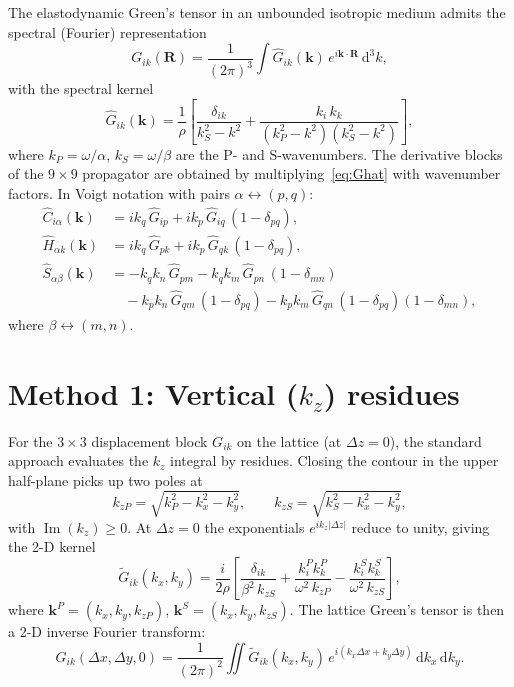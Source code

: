 \documentclass[11pt,a4paper]{article}
\newcommand{\dd}{\mathrm{d}}
\newcommand{\im}{\operatorname{Im}}
\newcommand{\bk}{\mathbf{k}}
\newcommand{\bR}{\mathbf{R}}
\begin{document}
The elastodynamic Green's tensor in an unbounded isotropic
medium admits the spectral (Fourier) representation
\begin{equation}\label{eq:Gspec}
  G_{ik}(\bR) = \frac{1}{(2\pi)^3}
  \int \hat{G}_{ik}(\bk)\,e^{i\bk\cdot\bR}\,\dd^3 k,
\end{equation}
with the spectral kernel
\begin{equation}\label{eq:Ghat}
  \hat{G}_{ik}(\bk) = \frac{1}{\rho}\left[
    \frac{\delta_{ik}}{k_S^2 - k^2}
    + \frac{k_i\,k_k}{\left(k_P^2 - k^2\right)\left(k_S^2 - k^2\right)}
  \right],
\end{equation}
where $k_P = \omega/\alpha$, $k_S = \omega/\beta$ are the P- and
S-wavenumbers.
The derivative blocks of the $9\times 9$ propagator are obtained by
multiplying~\eqref{eq:Ghat} with wavenumber factors.
In Voigt notation with pairs
$\alpha \leftrightarrow (p,q)$:
\begin{equation}\label{eq:blocks_spectral}
\begin{aligned}
  \hat{C}_{i\alpha}(\bk)
    &= i k_q\,\hat{G}_{ip}
       + i k_p\,\hat{G}_{iq}\,(1-\delta_{pq}),\\[4pt]
  \hat{H}_{\alpha k}(\bk)
    &= i k_q\,\hat{G}_{pk}
       + i k_p\,\hat{G}_{qk}\,(1-\delta_{pq}),\\[4pt]
  \hat{S}_{\alpha\beta}(\bk)
    &= -k_q k_n\,\hat{G}_{pm}
       -k_q k_m\,\hat{G}_{pn}\,(1-\delta_{mn})\\
    &\quad -k_p k_n\,\hat{G}_{qm}\,(1-\delta_{pq})
       -k_p k_m\,\hat{G}_{qn}\,(1-\delta_{pq})(1-\delta_{mn}),
\end{aligned}
\end{equation}
where $\beta \leftrightarrow (m,n)$.


\section{Method 1: Vertical (\texorpdfstring{$k_z$}{kz}) residues}\label{sec:kz}

For the $3\times 3$ displacement block $G_{ik}$ on the lattice
(at $\Delta z = 0$), the standard approach evaluates the $k_z$
integral by residues. Closing the contour in the upper half-plane
picks up two poles at
\[
  k_{zP} = \sqrt{k_P^2 - k_x^2 - k_y^2}, \qquad
  k_{zS} = \sqrt{k_S^2 - k_x^2 - k_y^2},
\]
with $\im(k_z) \ge 0$. At $\Delta z=0$ the exponentials
$e^{ik_{z}|{\Delta z}|}$ reduce to unity, giving the 2-D kernel
\begin{equation}\label{eq:kz_kernel}
  \tilde{G}_{ik}(k_x,k_y) = \frac{i}{2\rho}\left[
    \frac{\delta_{ik}}{\beta^2\,k_{zS}}
    + \frac{k^P_i k^P_k}{\omega^2\,k_{zP}}
    - \frac{k^S_i k^S_k}{\omega^2\,k_{zS}}
  \right],
\end{equation}
where $\bk^P = (k_x, k_y, k_{zP})$, $\bk^S = (k_x, k_y, k_{zS})$.
The lattice Green's tensor is then a 2-D inverse Fourier transform:
\begin{equation}\label{eq:2DIFFT}
  G_{ik}(\Delta x, \Delta y, 0)
  = \frac{1}{(2\pi)^2}\iint
    \tilde{G}_{ik}(k_x,k_y)\,
    e^{i(k_x\Delta x + k_y\Delta y)}\,
    \dd k_x\,\dd k_y.
\end{equation}
\end{document}
